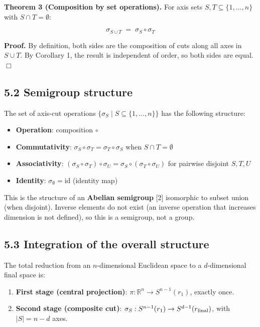 \documentclass[a4paper,11pt]{article}
\theoremstyle{definition}
\theoremstyle{remark}
\providecommand{\tightlist}{%
  \setlength{\itemsep}{0pt}\setlength{\parskip}{0pt}}
\begin{document}
\textbf{Theorem 3 (Composition by set operations).} For axis sets
\(S, T \subseteq \{1, \ldots, n\}\) with \(S \cap T = \emptyset\):

\[
\sigma_{S \cup T} \;=\; \sigma_S \circ \sigma_T
\]

\textbf{Proof.} By definition, both sides are the composition of cuts
along all axes in \(S \cup T\). By Corollary 1, the result is
independent of order, so both sides are equal. \(\Box\)

\subsection{5.2 Semigroup structure}\label{semigroup-structure}

The set of axis-cut operations
\(\{\sigma_S \mid S \subseteq \{1, \ldots, n\}\}\) has the following
structure:

\begin{itemize}
\tightlist
\item
  \textbf{Operation}: composition \(\circ\)
\item
  \textbf{Commutativity}:
  \(\sigma_S \circ \sigma_T = \sigma_T \circ \sigma_S\) when
  \(S \cap T = \emptyset\)
\item
  \textbf{Associativity}:
  \((\sigma_S \circ \sigma_T) \circ \sigma_U = \sigma_S \circ (\sigma_T \circ \sigma_U)\)
  for pairwise disjoint \(S, T, U\)
\item
  \textbf{Identity}: \(\sigma_\emptyset = \mathrm{id}\) (identity map)
\end{itemize}

This is the structure of an \textbf{Abelian semigroup} {[}2{]}
isomorphic to subset union (when disjoint). Inverse elements do not
exist (an inverse operation that increases dimension is not defined), so
this is a semigroup, not a group.

\subsection{5.3 Integration of the overall
structure}\label{integration-of-the-overall-structure}

The total reduction from an \(n\)-dimensional Euclidean space to a
\(d\)-dimensional final space is:

\begin{enumerate}
\def\labelenumi{\arabic{enumi}.}
\tightlist
\item
  \textbf{First stage (central projection)}:
  \(\pi: \mathbb{R}^n \to S^{n-1}(r_1)\), exactly once.
\item
  \textbf{Second stage (composite cut)}:
  \(\sigma_S: S^{n-1}(r_1) \to S^{d-1}(r_{\rm final})\), with
  \(|S| = n - d\) axes.
\end{enumerate}
\end{document}
